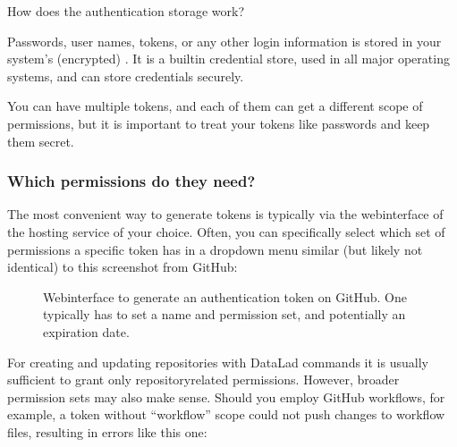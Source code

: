 \ignorespaces \begin{findoutmore}[label={index-1}, before title={\thetcbcounter\ }, check odd page=true]{How does the authentication storage work?}
\label{\detokenize{basics/101-139-hostingservices:index-1}}

\sphinxAtStartPar
Passwords, user names, tokens, or any other login information is stored in
your system’s (encrypted) .
It is a built\sphinxhyphen{}in credential store, used in all major operating systems, and
can store credentials securely.


\end{findoutmore}

\sphinxAtStartPar
You can have multiple tokens, and each of them can get a different scope of permissions, but it is important to treat your tokens like passwords and keep them secret.


\subsubsection{Which permissions do they need?}
\label{\detokenize{basics/101-139-hostingservices:which-permissions-do-they-need}}
\sphinxAtStartPar
The most convenient way to generate tokens is typically via the webinterface of the hosting service of your choice.
Often, you can specifically select which set of permissions a specific token has in a drop\sphinxhyphen{}down menu similar (but likely not identical) to this screenshot from GitHub:

\begin{figure}[tbp]
\centering
\capstart

\noindent{}
\caption{Webinterface to generate an authentication token on GitHub. One typically has to set a name and
permission set, and potentially an expiration date.}\label{\detokenize{basics/101-139-hostingservices:id8}}\end{figure}

\sphinxAtStartPar
For creating and updating repositories with DataLad commands it is usually sufficient to grant only repository\sphinxhyphen{}related permissions.
However, broader permission sets may also make sense.
Should you employ GitHub workflows, for example, a token without “workflow” scope could not push changes to workflow files, resulting in errors like this one:

\begin{sphinxVerbatim}[commandchars=\\\{\}]
\PYG{g+go}{[remote rejected] (refusing to allow a Personal Access Token to create or update workflow `.github/workflows/benchmarks.yml` without `workflow` scope)]}
\end{sphinxVerbatim}


